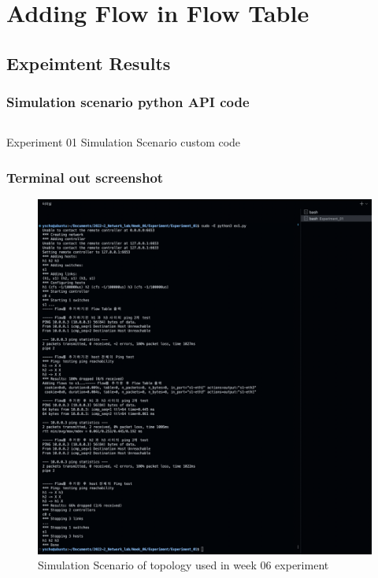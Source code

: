 \section{Adding Flow in Flow Table}
\subsection{Expeimtent Results}

\subsubsection{Simulation scenario python API code}
\begin{listing}[h!]
\inputminted[framerule = 1pt,framesep = 2mm , frame = lines, fontsize=\scriptsize]{python}{./code/week06/Experiment01.py}
\caption{\footnotesize Experiment 01 Simulation Scenario custom code }
\end{listing}
\clearpage
\subsubsection{Terminal out screenshot}
\begin{figure}[!h]\centering 
	\includegraphics[width=.99\textwidth]{image/week06/1-2.png}
	\caption{\footnotesize 
	Simulation Scenario of topology used in week 06 experiment}
	\vspace{-10pt}
\end{figure}
\clearpage